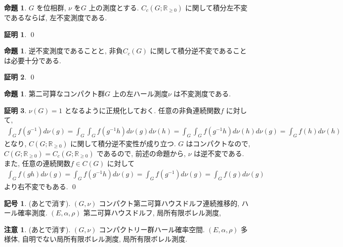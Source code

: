 \documentclass[10pt, fleqn, label-section=none]{bxjsarticle}
\theoremstyle{definition}
\newtheorem{prop}[dfn]{命題}
\newtheorem{notation}[dfn]{記号}
\newtheorem*{pf*}{証明}
\newtheorem{remark}[dfn]{注意}
\renewcommand{\;}{\, ; \,}
\begin{document}
\begin{prop}$G$ を位相群, $\nu$ を$G$ 上の測度とする. $C_c (G; \mathbb R_{\geq 0})$ に関して積分左不変であるならば, 左不変測度である.

\end{prop}
\begin{pf*}

\qed
\end{pf*}


\begin{prop}逆不変測度であることと, 非負$C_c(G)$ に関して積分逆不変であることは必要十分である.

\end{prop}
\begin{pf*}

\qed
\end{pf*}



\begin{prop}第二可算なコンパクト群$G$ 上の左ハール測度$\nu$ は不変測度である.
\end{prop}
\begin{pf*}$\nu(G) = 1$ となるように正規化しておく.  任意の非負連続関数$f$ に対して, 
\begin{align*} \int_G f(g^{-1}) d\nu(g) = \int_G \int_G f(g^{-1} h) d\nu(g) d\nu(h)
 = \int_G \int_G f(g^{-1} h) d\nu(h) d\nu(g) = \int_G f(h) d\nu(h)  \end{align*}
 となり, $C(G; \mathbb R_{\geq 0}) $ に関して積分逆不変性が成り立つ. $G$ はコンパクトなので, $C(G; \mathbb R_{\geq 0}) = C_c (G; \mathbb R_{\geq 0})$ であるので, 前述の命題から, $\nu$ は逆不変である. また, 任意の連続関数$f \in C(G)$ に対して
 \begin{align*}  \int_G f(gh) d\nu (g) = \int_G f(g^{-1}h) d\nu(g) = \int_G f(g^{-1}) d\nu(g) =  \int_G f(g) d\nu(g) \end{align*}
 より右不変でもある.
\qed
\end{pf*}


\begin{notation}(あとで消す). $(G, \nu)$ コンパクト第二可算ハウスドルフ連続推移的, ハール確率測度. 
$(E, \alpha, \rho)$ 第二可算ハウスドルフ, 局所有限ボレル測度, 

\end{notation}

\begin{remark}(あとで消す). $(G, \nu)$ コンパクトリー群ハール確率空間. $(E, \alpha, \rho)$ 多様体, 自明でない局所有限ボレル測度, 局所有限ボレル測度. 

\end{remark}
\end{document}
